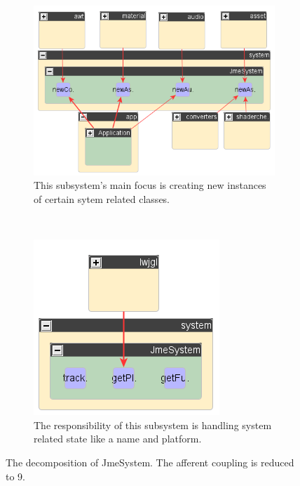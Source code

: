 \documentclass[a4paper, 10pt]{article}
\begin{document}
\begin{figure}
\begin{subfigure}[b]{0.6\textwidth}
\includegraphics[width=\textwidth]{figures/jme-system-factory-part.png}
\caption{This subsystem's main focus is creating new instances of certain sytem related classes.}
\label{fig:system-factory-incoming}
\end{subfigure}
~
\begin{subfigure}[b]{0.4\textwidth}
\includegraphics[width=\textwidth]{figures/jme-system-general-part.png}
\caption{The responsibility of this subsystem is handling system related state like a name and platform.}
\label{fig:system-state-incoming}
\end{subfigure}

\caption{The decomposition of JmeSystem. The afferent coupling is reduced to 9.}
\label{fig:system-decomposition}
\end{figure}
\end{document}
